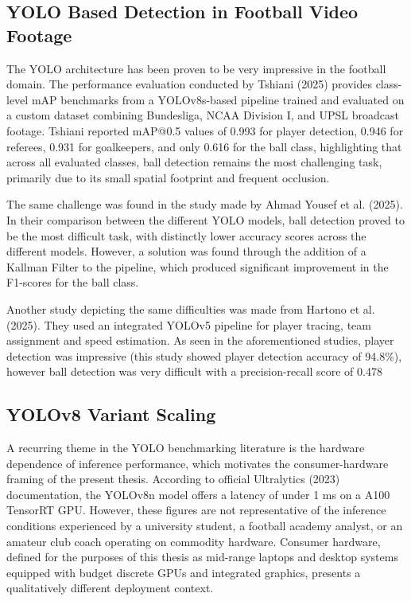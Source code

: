 \subsection{YOLO Based Detection in Football Video Footage}
The YOLO architecture has been proven to be very impressive in the football domain. The performance evaluation conducted by Tshiani (2025)\cite{RN15} provides class-level mAP benchmarks from a YOLOv8s-based pipeline trained and evaluated on a custom dataset combining Bundesliga, NCAA Division I, and UPSL broadcast footage. Tshiani reported mAP@0.5 values of 0.993 for player detection, 0.946 for referees, 0.931 for goalkeepers, and only 0.616 for the ball class, highlighting that across all evaluated classes, ball detection remains the most challenging task, primarily due to its small spatial footprint and frequent occlusion. 

The same challenge was found in the study made by Ahmad Yousef et al. (2025)\cite{RN13}. In their comparison between the different YOLO models, ball detection proved to be the most difficult task, with distinctly lower accuracy scores across the different models. However, a solution was found through the addition of a Kallman Filter to the pipeline, which produced significant improvement in the F1-scores for the ball class.

Another study depicting the same difficulties was made from Hartono et al. (2025)\cite{RN16}. They used an integrated YOLOv5 pipeline for player tracing, team assignment and speed estimation. As seen in the aforementioned studies, player detection was impressive (this study showed player detection accuracy of 94.8\%), however ball detection was very difficult with a precision-recall score of 0.478

\subsection{YOLOv8 Variant Scaling}
A recurring theme in the YOLO benchmarking literature is the hardware dependence of inference performance, which motivates the consumer-hardware framing of the present thesis. According to official Ultralytics (2023)\cite{RN10} documentation, the YOLOv8n model offers a latency of under 1 ms on a A100 TensorRT GPU. However, these figures are not representative of the inference conditions experienced by a university student, a football academy analyst, or an amateur club coach operating on commodity hardware. Consumer hardware, defined for the purposes of this thesis as mid-range laptops and desktop systems equipped with budget discrete GPUs and integrated graphics, presents a qualitatively different deployment context.

